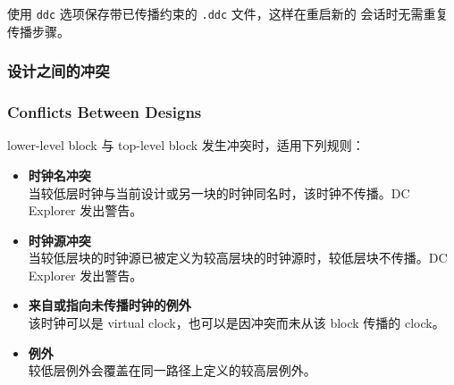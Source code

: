 使用  \texttt{ddc} 选项保存带已传播约束的 \texttt{.ddc} 文件，这样在重启新的  会话时无需重复传播步骤。

\subsubsection{设计之间的冲突}
\subsubsection*{Conflicts Between Designs}

lower-level block 与 top-level block 发生冲突时，适用下列规则：
\begin{itemize}
  \item \textbf{时钟名冲突}\\
        当较低层时钟与当前设计或另一块的时钟同名时，该时钟不传播。DC Explorer 发出警告。
  \item \textbf{时钟源冲突}\\
        当较低层块的时钟源已被定义为较高层块的时钟源时，较低层块不传播。DC Explorer 发出警告。
  \item \textbf{来自或指向未传播时钟的例外}\\
        该时钟可以是 virtual clock，也可以是因冲突而未从该 block 传播的 clock。
  \item \textbf{例外}\\
        较低层例外会覆盖在同一路径上定义的较高层例外。
\end{itemize}
